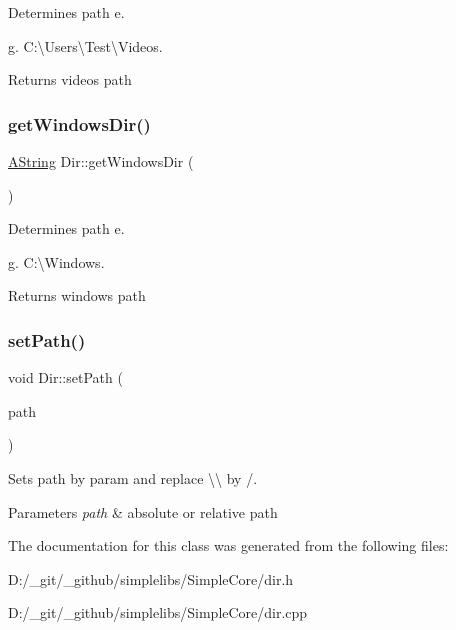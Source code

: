 Determines path e. 

g. C\+:\textbackslash{}\+Users\textbackslash{}\+Test\textbackslash{}\+Videos. \begin{DoxyReturn}{Returns}
videos path 
\end{DoxyReturn}
\mbox{\label{class_dir_adec7e9d0607805f8c6b7c44a0807b184}} 
\subsubsection{\texorpdfstring{getWindowsDir()}{getWindowsDir()}}
{\footnotesize\ttfamily \mbox{\hyperlink{class_a_string}{A\+String}} Dir\+::get\+Windows\+Dir (\begin{DoxyParamCaption}{ }\end{DoxyParamCaption})\hspace{0.3cm}{\ttfamily [static]}}



Determines path e. 

g. C\+:\textbackslash{}\+Windows. \begin{DoxyReturn}{Returns}
windows path 
\end{DoxyReturn}
\mbox{\label{class_dir_a08bb155c0d0ae5150997dedce31aa56f}} 
\subsubsection{\texorpdfstring{setPath()}{setPath()}}
{\footnotesize\ttfamily void Dir\+::set\+Path (\begin{DoxyParamCaption}\item[{const \mbox{\hyperlink{class_a_string}{A\+String}} \&}]{path }\end{DoxyParamCaption})}



Sets path by param and replace \textbackslash{}\textbackslash{} by /. 


\begin{DoxyParams}{Parameters}
{\em path} & absolute or relative path \\
\hline
\end{DoxyParams}


The documentation for this class was generated from the following files\+:\begin{DoxyCompactItemize}
\item 
D\+:/\+\_\+git/\+\_\+github/simplelibs/\+Simple\+Core/dir.\+h\item 
D\+:/\+\_\+git/\+\_\+github/simplelibs/\+Simple\+Core/dir.\+cpp\end{DoxyCompactItemize}
